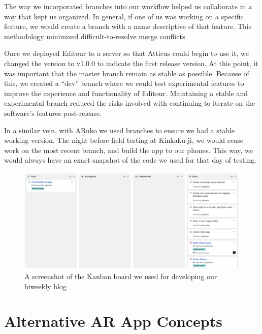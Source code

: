\documentclass[a4paper, 10pt, american, titlepage]{article}
\begin{document}
The way we incorporated branches into our workflow helped us collaborate in a
way that kept us organized. In general, if one of us was working on a specific
feature, we would create a branch with a name descriptive of that feature. This
methodology minimized difficult-to-resolve merge conflicts.

Once we deployed Editour to a server so that Atticus could begin to use it,
we changed the version to v1.0.0 to indicate the first release version. At this
point, it was important that the master branch remain as stable as possible.
Because of this, we created a ``dev'' branch where we could test experimental
features to improve the experience and functionality of Editour. Maintaining a
stable and experimental branch reduced the risks involved with continuing to
iterate on the software's features post-release.

In a similar vein, with ARuko we used branches to ensure we had a stable working
version. The night before field testing at Kinkaku-ji, we would cease work on
the most recent branch, and build the app to our phones. This way, we would
always have an exact snapshot of the code we used for that day of testing.

\begin{figure}[h]
	\centering
	\includegraphics[width=\textwidth]{kanban-board.png}
	\caption{A screenshot of the Kanban board we used for developing our
    biweekly blog}
	\label{fig:kanbanBoard}
\end{figure}

\clearpage

\section{Alternative AR App Concepts}
\label{sec:alternativeArAppConcepts}
\end{document}
